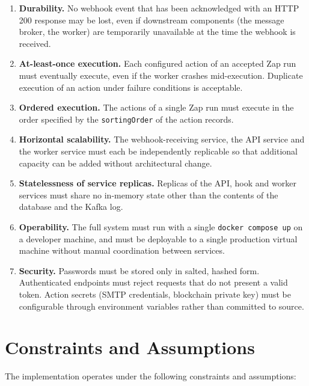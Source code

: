 \begin{enumerate}[label=NFR-\arabic*., leftmargin=*]
\item \textbf{Durability.} No webhook event that has been acknowledged with an HTTP 200 response may be lost, even if downstream components (the message broker, the worker) are temporarily unavailable at the time the webhook is received.
\item \textbf{At-least-once execution.} Each configured action of an accepted Zap run must eventually execute, even if the worker crashes mid-execution. Duplicate execution of an action under failure conditions is acceptable.
\item \textbf{Ordered execution.} The actions of a single Zap run must execute in the order specified by the \texttt{sortingOrder} of the action records.
\item \textbf{Horizontal scalability.} The webhook-receiving service, the API service and the worker service must each be independently replicable so that additional capacity can be added without architectural change.
\item \textbf{Statelessness of service replicas.} Replicas of the API, hook and worker services must share no in-memory state other than the contents of the database and the Kafka log.
\item \textbf{Operability.} The full system must run with a single \texttt{docker compose up} on a developer machine, and must be deployable to a single production virtual machine without manual coordination between services.
\item \textbf{Security.} Passwords must be stored only in salted, hashed form. Authenticated endpoints must reject requests that do not present a valid token. Action secrets (SMTP credentials, blockchain private key) must be configurable through environment variables rather than committed to source.
\end{enumerate}

\section{Constraints and Assumptions}

The implementation operates under the following constraints and assumptions:

